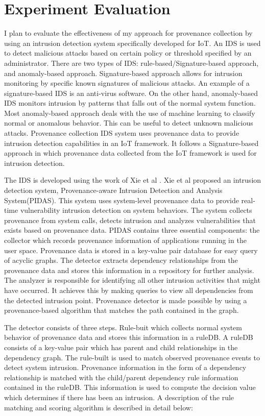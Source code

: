 \section{Experiment Evaluation}

I plan to evaluate the effectiveness of my approach for provenance collection by using an intrusion detection system specifically developed for IoT. An IDS is used to detect malicious attacks based on certain policy or threshold specified by an administrator. There are two types of  IDS: rule-based/Signature-based approach, and anomaly-based approach. Signature-based approach allows for intrusion monitoring by specific known signatures of malicious attacks. An example of a signature-based IDS is an anti-virus software. On the other hand, anomaly-based IDS monitors intrusion by patterns that falls out of the normal system function. Most anomaly-based approach deals with the use of machine learning to classify normal or anomalous behavior. This can be useful to detect unknown malicious attacks. Provenance collection IDS system uses provenance data to provide intrusion detection capabilities in an IoT framework. It follows a Signature-based approach in which provenance data collected from the IoT framework is used for intrusion detection. 
\par The IDS is developed using the work of Xie et al \cite{Xie:2016:UID:2936026.2936232}. Xie et al proposed an intrusion detection system, Provenance-aware Intrusion Detection and Analysis System(PIDAS). This system uses system-level provenance data to provide real-time vulnerability intrusion detection on system behaviors. The system collects provenance from system calls, detects intrusion and analyzes vulnerabilities that exists based on provenance data. PIDAS contains three essential components: the collector which records provenance information of applications running in the user space. Provenance data is stored in a key-value pair database for easy query of acyclic graphs. The detector extracts dependency relationships from the provenance data and stores this information in a repository for further analysis. The analyzer is responsible for identifying all other intrusion activities that might have occurred. It achieves this by making queries to view all dependencies from the detected intrusion point. Provenance detector is made possible by using a provenance-based algorithm that matches the path contained in the graph.


The detector consists of three steps. Rule-buit which collects normal system behavior of provenance data and stores this information in a ruleDB. A ruleDB consists of a key-value pair which has parent and child relationships in the dependency graph. The rule-built is used to match observed provenance events  to detect system intrusion. Provenance information in the form of a dependency relationship is matched with the child/parent dependency rule information contained in the ruleDB. This information is used to compute the decision value which determines if there has been an intrusion.  A description of the rule matching and scoring algorithm is described in detail below: 

